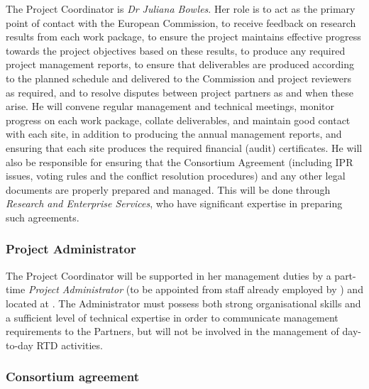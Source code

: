 \documentclass[a4paper,11pt]{article}
\begin{document}
The Project Coordinator is \emph{Dr Juliana Bowles}.  Her role
is to act as the primary point of contact with the European
Commission, to receive feedback on research results from each
work package, to ensure the project maintains effective
progress towards the project objectives based on these results,
to produce any required  project management reports, to ensure
that deliverables are produced according to the planned
schedule and delivered to the Commission and project reviewers
as required, and to resolve disputes between project partners
as and when these arise.  He will convene regular management
and technical meetings, monitor progress on each work package,
collate deliverables, and maintain good contact with each site,
in addition to producing the annual management reports, and
ensuring that each site produces the required financial (audit)
certificates.  He will also be responsible for ensuring that
the Consortium Agreement (including IPR issues, voting rules and the conflict resolution procedures)
and any other legal documents are properly prepared and managed. This will be
done through \SAshort{} \emph{Research and Enterprise
Services}, who have significant expertise in preparing such
agreements.

\vspace{12pt}
\subsubsection*{Project Administrator}
\vspace{-6pt}

The Project Coordinator will be supported in her management
duties by a part-time \emph{Project Administrator} (to be appointed
from staff already employed by \SA{}) and located at \SA{}.  The Administrator
must possess both strong organisational skills and a
sufficient level of technical expertise in order to communicate
management requirements to the Partners, but will not be
involved in the management of day-to-day RTD activities.

\vspace{12pt}
\subsubsection*{Consortium agreement}
\vspace{-6pt}


\end{document}
